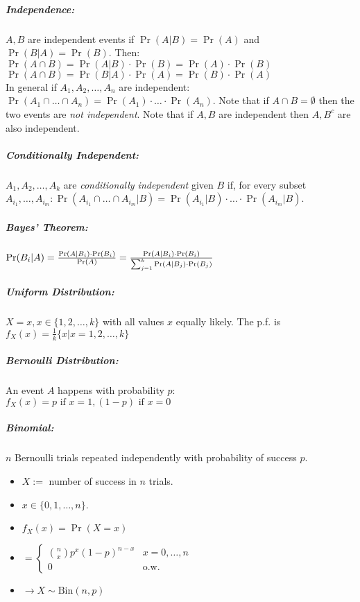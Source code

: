 \documentclass[landscape,10pt]{article}
\begin{document}
\begin{multicols}{4}
    \subparagraph*{Independence:}
        \(A, B\) are independent events if \(\Pr(A|B) = \Pr(A)\) and \(\Pr(B|A) = \Pr(B)\). Then: \\
        \(\Pr(A \cap B) = \Pr(A|B) \cdot \Pr(B) = \Pr(A) \cdot \Pr(B)\) \\
        \(\Pr(A \cap B) = \Pr(B | A) \cdot \Pr(A) = \Pr(B) \cdot \Pr(A)\)\\
        In general if \(A_1, A_2, \ldots, A_n\) are independent: \(\Pr(A_1 \cap \ldots \cap A_n) = \Pr(A_1) \cdot \ldots \cdot \Pr(A_n)\). Note that if \(A \cap B = \emptyset\) then the two events are \textit{not independent}.  Note that if \(A, B\) are independent then \(A, B^c\) are also independent.

    \subparagraph*{Conditionally Independent: } 
        \(A_1, A_2, \ldots, A_k\) are \textit{conditionally independent} given \(B\) if, for every subset \(A_{i_1}, \ldots, A_{i_m}: \Pr(A_{i_1} \cap \ldots \cap A_{i_m} | B) = \Pr(A_{i_1} | B) \cdot \ldots \cdot \Pr(A_{i_m} | B)\).

    \subparagraph*{Bayes' Theorem:}
    \(\Pr(B_i|A)\\ = \frac{\Pr(A|B_i) \cdot \Pr(B_i)}{\Pr(A)}
     = \frac{\Pr(A|B_i) \cdot \Pr(B_i)}{\sum_{j=1}^{k}\Pr(A|B_j) \cdot \Pr(B_j)}\)

    \subparagraph*{Uniform Distribution: }
        \(X = x, x \in \{1, 2, \ldots, k\}\) with all values \(x\) equally likely. The p.f. is \(f_X(x) = \frac{1}{k} \{x | x = 1, 2, \ldots, k\}\)
    

    \subparagraph*{Bernoulli Distribution: }
        An event \(A\) happens with probability \(p\):\\ \(f_X(x) = p \text{ if } x = 1, (1-p) \text{ if } x = 0\)

    \subparagraph*{Binomial:}
        \(n\) Bernoulli trials repeated independently with probability of success \(p\). 
        \begin{itemize}
            \item[] \(X :=\) number of success in \(n\) trials. 
            \item[] \(x \in \{0, 1, \ldots, n\}\). 
            \item[] \(f_X(x) = \Pr(X=x)\)
            \item[] \( =
    \begin{cases}
    {n \choose x} p^x (1-p)^{n-x}   &   x=0, \ldots, n \\
    0                               &   \text{o.w.}
    \end{cases} \)
            \item[] \(\rightarrow X \sim \text{Bin}(n,p)\)
        \end{itemize}


\end{multicols}
\end{document}
